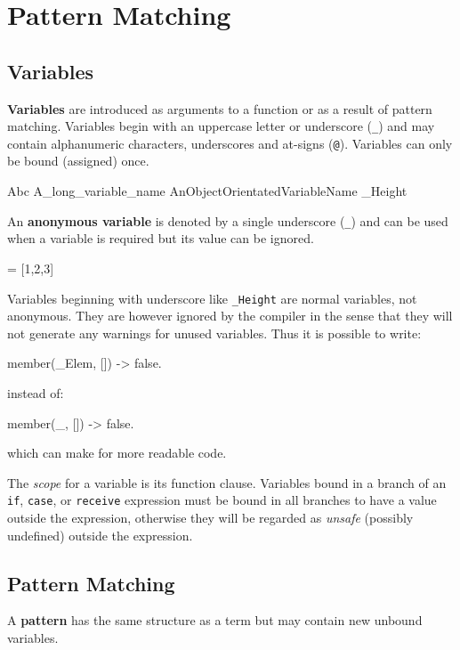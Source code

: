 \chapter{Pattern Matching}
\label{patterns}

\section{Variables}
\label{patterns:variables}

\textbf{Variables} are introduced as arguments to a function or as a
result of pattern matching. Variables begin with an uppercase letter
or underscore (\texttt{\_}) and may contain alphanumeric characters,
underscores and at-signs (\texttt{@}). Variables can only be bound
(assigned) once.

\begin{erlang}
Abc
A_long_variable_name
AnObjectOrientatedVariableName
_Height
\end{erlang}

An \textbf{anonymous variable} is denoted by a single underscore (\texttt{\_})
and can be used when a variable is required but its value can be
ignored.

\begin{erlang}
[H|_] = [1,2,3]         %
\end{erlang}

Variables beginning with underscore like \texttt{\_Height} are normal
variables, not anonymous. They are however ignored by the compiler in
the sense that they will not generate any warnings for unused
variables. Thus it is possible to write:

\begin{erlang}
member(_Elem, []) ->
    false.
\end{erlang}

instead of:

\begin{erlang}
member(_, []) ->
    false.
\end{erlang}

which can make for more readable code.

The \textit{scope} for a variable is its function clause. Variables
bound in a branch of an \texttt{if}, \texttt{case}, or
\texttt{receive} expression must be bound in all branches to have a
value outside the expression, otherwise they will be regarded as
\textit{unsafe} (possibly undefined) outside the expression.


\section{Pattern Matching}
A \textbf{pattern} has the same structure as a term but may contain
new unbound variables.

